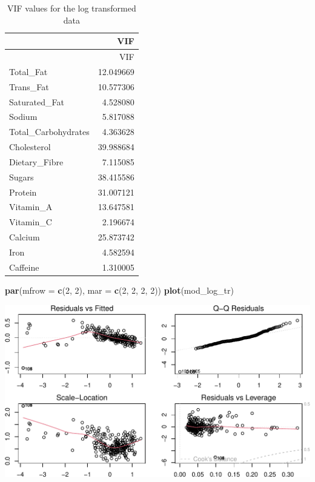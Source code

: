 \documentclass[
]{article}
\newenvironment{Shaded}{\begin{snugshade}}{\end{snugshade}}
\newcommand{\AttributeTok}[1]{\textcolor[rgb]{0.13,0.29,0.53}{#1}}
\newcommand{\DecValTok}[1]{\textcolor[rgb]{0.00,0.00,0.81}{#1}}
\newcommand{\FunctionTok}[1]{\textcolor[rgb]{0.13,0.29,0.53}{\textbf{#1}}}
\newcommand{\NormalTok}[1]{#1}
\begin{document}
\begin{longtable}[]{@{}lr@{}}
\caption{VIF values for the log transformed data}\tabularnewline
\toprule\noalign{}
& VIF \\
\midrule\noalign{}
\endfirsthead
\toprule\noalign{}
& VIF \\
\midrule\noalign{}
\endhead
\bottomrule\noalign{}
\endlastfoot
Total\_Fat & 12.049669 \\
Trans\_Fat & 10.577306 \\
Saturated\_Fat & 4.528080 \\
Sodium & 5.817088 \\
Total\_Carbohydrates & 4.363628 \\
Cholesterol & 39.988684 \\
Dietary\_Fibre & 7.115085 \\
Sugars & 38.415586 \\
Protein & 31.007121 \\
Vitamin\_A & 13.647581 \\
Vitamin\_C & 2.196674 \\
Calcium & 25.873742 \\
Iron & 4.582594 \\
Caffeine & 1.310005 \\
\end{longtable}

\begin{Shaded}
\begin{Highlighting}[]
\FunctionTok{par}\NormalTok{(}\AttributeTok{mfrow =} \FunctionTok{c}\NormalTok{(}\DecValTok{2}\NormalTok{, }\DecValTok{2}\NormalTok{), }\AttributeTok{mar =} \FunctionTok{c}\NormalTok{(}\DecValTok{2}\NormalTok{, }\DecValTok{2}\NormalTok{, }\DecValTok{2}\NormalTok{, }\DecValTok{2}\NormalTok{))}
\FunctionTok{plot}\NormalTok{(mod\_log\_tr)}
\end{Highlighting}
\end{Shaded}

\begin{center}\includegraphics{Statistical_Learning_Final_Report_files/figure-latex/vif-1} \end{center}
\end{document}
